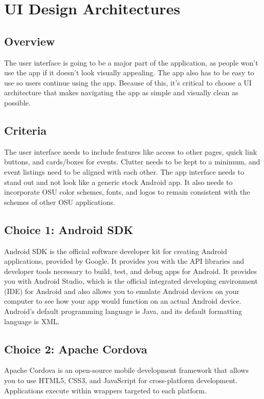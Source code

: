 \documentclass[draftclsnofoot, onecolumn, 10pt, compsoc]{IEEEtran}
\begin{document}
	\section{UI Design Architectures}
		\subsection{Overview}
			The user interface is going to be a major part of the application, as people won't use the app if it doesn't look visually appealing. The app also has to be easy to use so users continue using the app. Because of this, it's critical to choose a UI architecture that makes navigating the app as simple and visually clean as possible.
		\subsection{Criteria}
			The user interface needs to include features like access to other pages, quick link buttons, and cards/boxes for events. Clutter needs to be kept to a minimum, and event listings need to be aligned with each other. The app interface needs to stand out and not look like a generic stock Android app. It also needs to incorporate OSU color schemes, fonts, and logos to remain consistent with the schemes of other OSU applications.
		\subsection{Choice 1: Android SDK}
			Android SDK is the official software developer kit for creating Android applications, provided by Google. It provides you with the API libraries and developer tools necessary to build, test, and debug apps for Android. It provides you with Android Studio, which is the official integrated developing environment (IDE) for Android and also allows you to emulate Android devices on your computer to see how your app would function on an actual Android device. Android's default programming language is Java, and its default formatting language is XML.
			~\cite{AndroidSDK_vs_SemanticUI}
			
		\subsection{Choice 2: Apache Cordova}
			Apache Cordova is an open-source mobile development framework that allows you to use HTML5, CSS3, and JavaScript for cross-platform development. Applications execute within wrappers targeted to each platform.
			~\cite{Apache_Cordova}
		
\end{document}
